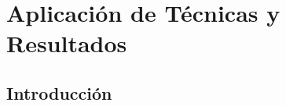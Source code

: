 
\chapter{Aplicación de Técnicas y Resultados} %
\label{chap:results} %


\section{Introducción}







